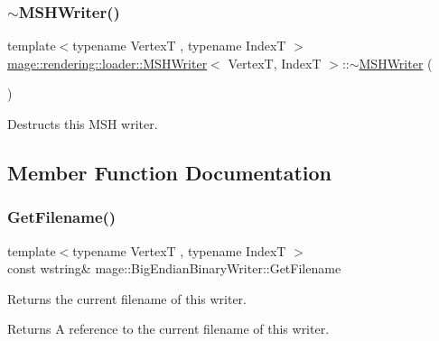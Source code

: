 \subsubsection{\texorpdfstring{$\sim$\+M\+S\+H\+Writer()}{~MSHWriter()}}
{\footnotesize\ttfamily template$<$typename VertexT , typename IndexT $>$ \\
\mbox{\hyperlink{classmage_1_1rendering_1_1loader_1_1_m_s_h_writer}{mage\+::rendering\+::loader\+::\+M\+S\+H\+Writer}}$<$ VertexT, IndexT $>$\+::$\sim$\mbox{\hyperlink{classmage_1_1rendering_1_1loader_1_1_m_s_h_writer}{M\+S\+H\+Writer}} (\begin{DoxyParamCaption}{ }\end{DoxyParamCaption})}

Destructs this M\+SH writer. 

\subsection{Member Function Documentation}
\mbox{\label{classmage_1_1rendering_1_1loader_1_1_m_s_h_writer_a61a80be19c7b59ff5803e51401e8f646}} 
\subsubsection{\texorpdfstring{Get\+Filename()}{GetFilename()}}
{\footnotesize\ttfamily template$<$typename VertexT , typename IndexT $>$ \\
const wstring\& mage\+::\+Big\+Endian\+Binary\+Writer\+::\+Get\+Filename\hspace{0.3cm}{\ttfamily [noexcept]}}

Returns the current filename of this writer.

\begin{DoxyReturn}{Returns}
A reference to the current filename of this writer. 
\end{DoxyReturn}
\mbox{\label{classmage_1_1rendering_1_1loader_1_1_m_s_h_writer_a661eaab96539a7bf08f100095603af0e}} 
